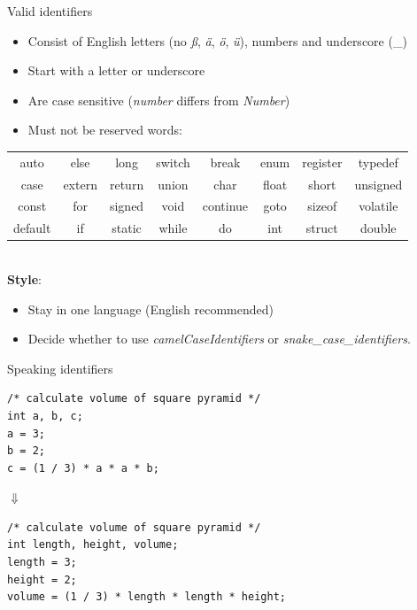 \begin{frame}{Valid identifiers}
	\begin{itemize}
		\item Consist of English letters (no \textit{ß}, \textit{ä}, \textit{ö}, \textit{ü}), numbers and underscore (\_)
		\item Start with a letter or underscore
		\item Are case sensitive (\textit{number} differs from \textit{Number})
		\item Must not be reserved words:
	\end{itemize}
    {\scriptsize\tt\begin{tabular}{cccccccc}
        auto	& else	& long	& switch & break	& enum	& register	& typedef\\
        case	& extern	& return	& union & char	& float	& short	& unsigned\\
        const	& for	& signed	& void & continue	& goto	& sizeof	& volatile\\
        default	& if	& static	& while & do	& int	& struct &   double
    \end{tabular}}
    \\\bigskip
	\textbf{Style}:\\
	\begin{itemize}
		\item Stay in one language (English recommended)
		\item Decide whether to use \textit{camelCaseIdentifiers} or \textit{snake\_case\_identifiers}.\\
	\end{itemize}
\end{frame}

\begin{frame}[fragile]{Speaking identifiers}
	\begin{lstlisting}
/* calculate volume of square pyramid */
int a, b, c;
a = 3;
b = 2;
c = (1 / 3) * a * a * b;
\end{lstlisting}
\centering
$\Downarrow$
	\begin{lstlisting}
/* calculate volume of square pyramid */
int length, height, volume;
length = 3;
height = 2;
volume = (1 / 3) * length * length * height;
\end{lstlisting}
\end{frame}

